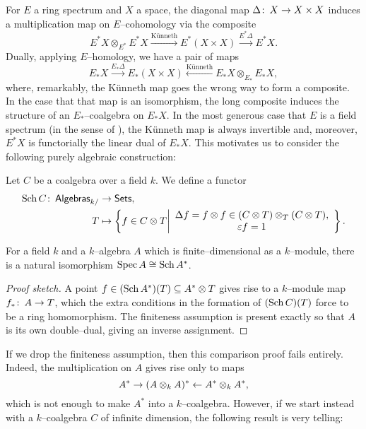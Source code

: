 For $E$ a ring spectrum and $X$ a space, the diagonal map $\Delta\colon\thinspace X \to X \times X$ induces a multiplication map on $E$--cohomology via the composite \[E^* X \otimes_{E^*} E^* X \xrightarrow{\text{K\"unneth}} E^*(X \times X) \xrightarrow{E^* \Delta} E^* X.\]  Dually, applying $E$--homology, we have a pair of maps \[E_* X \xrightarrow{E_* \Delta} E_*(X \times X) \xleftarrow{\text{K\"unneth}} E_* X \otimes_{E_*} E_* X,\] where, remarkably, the K\"unneth map goes the wrong way to form a composite.  In the case that that map is an isomorphism, the long composite induces the structure of an $E_*$--coalgebra on $E_* X$.  In the most generous case that $E$ is a field spectrum (in the sense of ), the K\"unneth map is always invertible and, moreover, $E^* X$ is functorially the linear dual of $E_* X$.  This motivates us to consider the following purely algebraic construction:

\begin{definition}
Let $C$ be a coalgebra over a field $k$.  We define a functor
\begin{align*}
\operatorname{Sch} C\colon\thinspace \mathsf{Algebras}_{k/} & \to \mathsf{Sets}, \\
T & \mapsto \left\{f \in C \otimes T \middle| \begin{array}{c} \Delta f = f \otimes f \in (C \otimes T) \otimes_T (C \otimes T), \\ \varepsilon f = 1 \end{array} \right\}.
\end{align*}
\end{definition}

\begin{lemma}
For a field $k$ and a $k$--algebra $A$ which is finite--dimensional as a $k$--module, there is a natural isomorphism $\operatorname{Spec} A \cong \operatorname{Sch} A^*$.
\end{lemma}
\begin{proof}[Proof sketch]
A point $f \in (\operatorname{Sch} A^*)(T) \subseteq A^* \otimes T$ gives rise to a $k$--module map $f_*\colon\thinspace A \to T$, which the extra conditions in the formation of $(\operatorname{Sch} C)(T)$ force to be a ring homomorphism.  The finiteness assumption is present exactly so that $A$ is its own double--dual, giving an inverse assignment.
\end{proof}

If we drop the finiteness assumption, then this comparison proof fails entirely.  Indeed, the multiplication on $A$ gives rise only to maps \[A^* \to (A \otimes_k A)^* \leftarrow A^* \otimes_k A^*,\] which is not enough to make $A^*$ into a $k$--coalgebra.  However, if we start instead with a $k$--coalgebra $C$ of infinite dimension, the following result is very telling:

